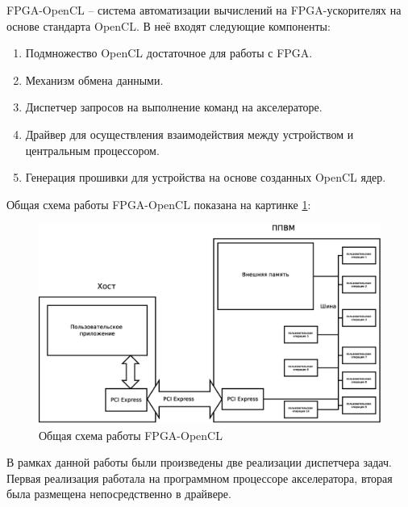FPGA-OpenCL -- система автоматизации вычислений на FPGA-ускорителях на основе
 стандарта OpenCL. В неё входят следующие компоненты:
\begin{enumerate}
   \item Подмножество OpenCL достаточное для работы с
   FPGA.
   \item Механизм обмена данными.
   \item Диспетчер запросов на выполнение команд на акселераторе.
   \item Драйвер для осуществления взаимодействия между устройством и
   центральным процессором.
   \item Генерация прошивки для устройства на основе созданных OpenCL ядер.
\end{enumerate}

Общая схема работы FPGA-OpenCL показана на картинке \ref{fpga-cell}:

\begin{figure}[h!]
\includegraphics [width=\textwidth]{pictures/base-scheme}
\caption{Общая схема работы FPGA-OpenCL}
\label{fpga-cell}
\end{figure}

В рамках данной работы были произведены две реализации диспетчера задач. Первая
реализация работала на программном процессоре акселератора, вторая была
размещена непосредственно в драйвере.
